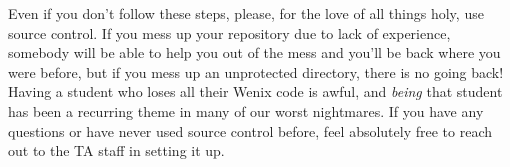 Even if you don't follow these steps, please, for the love of all things holy, use source control. If you mess up your repository due to lack of experience, somebody will be able to help you out of the mess and you'll be back where you were before, but if you mess up an unprotected directory, there is no going back! Having a student who loses all their Wenix code is awful, and \emph{being} that student has been a recurring theme in many of our worst nightmares. If you have any questions or have never used source control before, feel absolutely free to reach out to the TA staff in setting it up.
 
